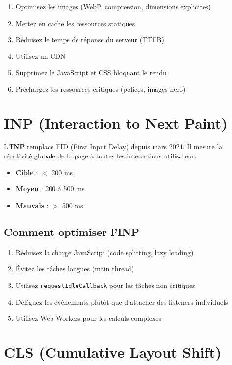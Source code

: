 \documentclass[12pt,a4paper,twoside]{report}
\newcommand{\keyword}[1]{\textbf{\textcolor{googleblue}{#1}}}
\begin{document}
\begin{enumerate}
    \item Optimisez les images (WebP, compression, dimensions explicites)
    \item Mettez en cache les ressources statiques
    \item Réduisez le temps de réponse du serveur (TTFB)
    \item Utilisez un CDN
    \item Supprimez le JavaScript et CSS bloquant le rendu
    \item Préchargez les ressources critiques (polices, images hero)
\end{enumerate}

\section{INP (Interaction to Next Paint)}

L'\keyword{INP} remplace FID (First Input Delay) depuis mars 2024. Il mesure la réactivité globale de la page à toutes les interactions utilisateur.

\begin{itemize}
    \item \textbf{Cible} : $<$ 200 ms
    \item \textbf{Moyen} : 200 à 500 ms
    \item \textbf{Mauvais} : $>$ 500 ms
\end{itemize}

\subsection{Comment optimiser l'INP}

\begin{enumerate}
    \item Réduisez la charge JavaScript (code splitting, lazy loading)
    \item Évitez les tâches longues (main thread)
    \item Utilisez \texttt{requestIdleCallback} pour les tâches non critiques
    \item Déléguez les événements plutôt que d'attacher des listeners individuels
    \item Utilisez Web Workers pour les calculs complexes
\end{enumerate}

\section{CLS (Cumulative Layout Shift)}
\end{document}
